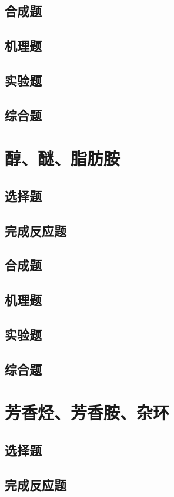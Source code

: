 \documentclass[
  10pt,
  twoside,
  openany,
  b5paper, %
  colorscheme = basic, %
]{qyxf-book}
\begin{document}
\section{合成题}
\section{机理题}
\section{实验题}
\section{综合题}

\chapter{醇、醚、脂肪胺}

\section{选择题}
\section{完成反应题}
\section{合成题}
\section{机理题}
\section{实验题}
\section{综合题}

\chapter{芳香烃、芳香胺、杂环}

\section{选择题}
\section{完成反应题}
\end{document}

